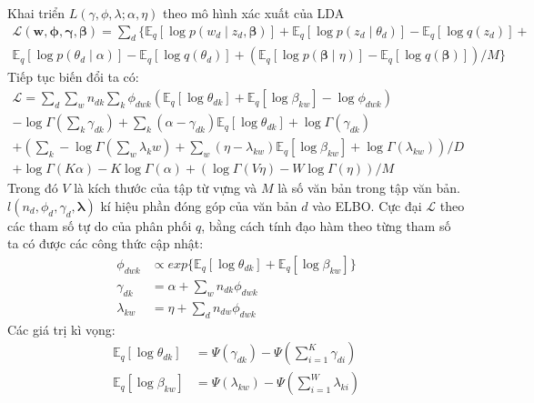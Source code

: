 \documentclass[fontsize=13pt]{scrartcl}
\begin{document}
\par 
Khai triển $L(\gamma,\phi,\lambda;\alpha,\eta)$ theo mô hình xác xuất của LDA
\begin{equation}
\begin{split}
 \mathcal{L}(\mathbf{w},\boldsymbol\phi, \boldsymbol\gamma,\boldsymbol\beta) = 
\sum_d \{ \mathbb{E}_q[\log p(w_d \mid z_d,\boldsymbol\beta)] + \mathbb{E}_q[\log p(z_d\mid \theta_d)]  -\mathbb{E}_q[\log q(z_d)] + \\ \mathbb{E}_q[\log p(\theta_d \mid \alpha)] - \mathbb{E}_q[\log q(\theta_d)]  +(\mathbb{E}_q[\log p(\boldsymbol\beta \mid \eta)] - \mathbb{E}_q[\log q(\boldsymbol\beta)])/M \}
\end{split}
\end{equation}
Tiếp tục biến đổi ta có:
\begin{equation}
\begin{split}
\mathcal{L} = \sum_{d}\sum_{w}n_{dk}\sum_{k}\phi_{dwk}(\mathbb{E}_{q}[\log\theta_{dk}] +\mathbb{E}_q[\log\beta_{kw}] - \log\phi_{dwk} ) \\
- \log\Gamma(\sum_{k}\gamma_{dk}) + \sum_{k}(\alpha - \gamma_{dk})\mathbb{E}_q[\log \theta_{dk}] + \log\Gamma(\gamma_{dk})\\
+(\sum_{k} -\log\Gamma(\sum_{w}\lambda_kw) + \sum_{w}(\eta - \lambda_{kw})\mathbb{E}_q[\log\beta_{kw}] + \log\Gamma(\lambda_{kw}))/D\\
+ \log\Gamma(K\alpha) - K\log\Gamma(\alpha) + (\log\Gamma(V\eta) - W\log\Gamma(\eta))/M
\end{split}
\end{equation}
Trong đó $V$ là kích thước của tập từ vựng và $M$ là số văn bản trong tập văn bản. $l(n_d,\phi_d,\gamma_d,\boldsymbol\lambda)$ kí hiệu phần đóng góp của văn bản $d$ vào ELBO. Cực đại $\mathcal{L}$ theo các tham số tự do của phân phối $q$, bằng cách tính đạo hàm theo từng tham số ta có được các công thức cập nhật:
\begin{align}
\phi_{dwk} &\propto exp\{\mathbb{E}_q[\log\theta_{dk}] + \mathbb{E}_q[\log\beta_{kw}]\} \label{eq:variantphi}\\
\gamma_{dk} &= \alpha + \sum_{w}n_{dk}\phi_{dwk} \label{varaintgamma}\\
\lambda_{kw} &= \eta + \sum_{d}n_{dw}\phi_{dwk} 
\end{align}
Các giá trị kì vọng:
\begin{align}
\mathbb{E}_q[\log\theta_{dk}] &= \Psi(\gamma_{dk}) - \Psi(\sum_{i=1}^{K}\gamma_{di})\\
\mathbb{E}_q[\log\beta_{kw}] &= \Psi(\lambda_{kw}) - \Psi(\sum_{i=1}^{W}\lambda_{ki})
\end{align}
\end{document}
